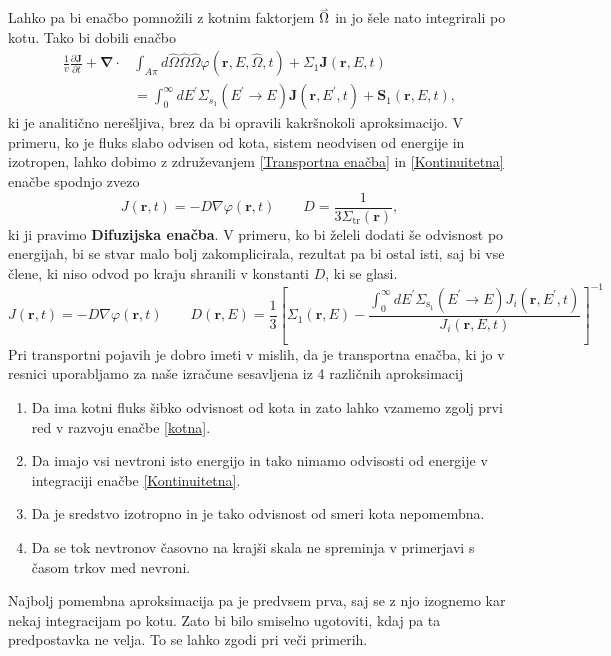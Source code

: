 \documentclass[slovene,11pt,a4paper]{article}
\def\phi{\varphi}
\renewcommand{\vec}[1]{\overset{\smash{\hbox{\raise -0.42ex\hbox{$\scriptscriptstyle\rightharpoonup$}}}}{#1}}
\begin{document}
Lahko pa bi enačbo pomnožili z kotnim faktorjem $\vec{\Omega}$ in jo šele nato integrirali po kotu. Tako bi dobili enačbo 
\begin{equation}
\begin{aligned}
\frac{1}{v} \frac{\partial \mathbf{J}}{\partial t}+\boldsymbol{\nabla} \cdot & \int_{A \pi} d \hat{\Omega} \hat{\Omega} \hat{\Omega} \varphi(\mathbf{r}, E, \hat{\Omega}, t)+\Sigma_{1} \mathbf{J}(\mathbf{r}, E, t) \\
&=\int_{0}^{\infty} d E^{\prime} \Sigma_{s_{1}}\left(E^{\prime} \rightarrow E\right) \mathbf{J}\left(\mathbf{r}, E^{\prime}, t\right)+\mathbf{S}_{1}(\mathbf{r}, E, t),
\end{aligned}
\label{Kontinuitetna}
\end{equation}
ki je analitično nerešljiva, brez da bi opravili kakršnokoli aproksimacijo. V primeru, ko je fluks slabo odvisen od kota, sistem neodvisen od energije in izotropen, lahko dobimo z združevanjem \eqref{Transportna enačba} in \eqref{Kontinuitetna} enačbe spodnjo zvezo
\begin{equation}
J(\mathbf{r}, t)=-D \nabla \phi(\mathbf{r}, t) \qquad D=\frac{1}{3 \Sigma_{\mathrm{tr}}(\mathbf{r})} ,
\label{Difuzijska enačba}
\end{equation}
ki ji pravimo \textbf{Difuzijska enačba}. V primeru, ko bi želeli dodati še odvisnost po energijah, bi se stvar malo bolj zakomplicirala, rezultat pa bi ostal isti, saj bi vse člene, ki niso odvod po kraju shranili v konstanti $D$, ki se glasi.
\begin{equation}
J(\mathbf{r}, t)=-D \nabla \phi(\mathbf{r}, t) \qquad D(\mathbf{r}, E)=\frac{1}{3}\left[\Sigma_{1}(\mathbf{r}, E)-\frac{\int_{0}^{\infty} d E^{\prime} \Sigma_{\mathrm{s}_{1}}\left(E^{\prime} \rightarrow E\right) J_{i}\left(\mathbf{r}, E^{\prime}, t\right)}{J_{i}(\mathbf{r}, E, t)}\right]^{-1}
\end{equation}
Pri transportni pojavih je dobro imeti v mislih, da je transportna enačba, ki jo v resnici uporabljamo za naše izračune sesavljena iz 4 različnih aproksimacij
\begin{enumerate}
    \item Da ima kotni fluks šibko odvisnost od kota in zato lahko vzamemo zgolj prvi red v razvoju enačbe \eqref{kotna}.
    \item Da imajo vsi nevtroni isto energijo in tako nimamo odvisosti od energije v integraciji enačbe \eqref{Kontinuitetna}.
    \item Da je sredstvo izotropno in je tako odvisnost od smeri kota nepomembna.
    \item Da se tok nevtronov časovno na krajši skala ne spreminja v primerjavi s časom trkov med nevroni.
\end{enumerate}
Najbolj pomembna aproksimacija pa je predvsem prva, saj se z njo izognemo kar nekaj integracijam po kotu. Zato bi bilo smiselno ugotoviti, kdaj pa ta predpostavka ne velja. To se lahko zgodi pri veči primerih.
\end{document}
